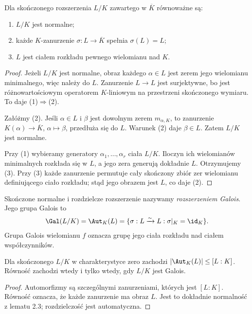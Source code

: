 \begin{lemat}
Dla skończonego rozszerzenia $L/K$ zawartego w $\overline K$ równoważne są:
\begin{enumerate}
\item $L/K$ jest normalne;
\item każde $K$-zanurzenie $\sigma:L\to\overline K$ spełnia $\sigma(L)=L$;
\item $L$ jest ciałem rozkładu pewnego wielomianu nad $K$.
\end{enumerate}
\end{lemat}
\begin{proof}
Jeżeli $L/K$ jest normalne, obraz każdego $\alpha\in L$ jest zerem jego wielomianu minimalnego, więc należy do $L$. Zanurzenie $L\to L$ jest surjektywne, bo jest różnowartościowym operatorem $K$-liniowym na przestrzeni skończonego wymiaru. To daje (1)$\Rightarrow$(2).

Załóżmy (2). Jeśli $\alpha\in L$ i $\beta$ jest dowolnym zerem $m_{\alpha,K}$, to zanurzenie $K(\alpha)\to\overline K$, $\alpha\mapsto\beta$, przedłuża się do $L$. Warunek (2) daje $\beta\in L$. Zatem $L/K$ jest normalne.

Przy (1) wybieramy generatory $\alpha_1,\dots,\alpha_r$ ciała $L/K$. Iloczyn ich wielomianów minimalnych rozkłada się w $L$, a jego zera generują dokładnie $L$. Otrzymujemy (3). Przy (3) każde zanurzenie permutuje cały skończony zbiór zer wielomianu definiującego ciało rozkładu; stąd jego obrazem jest $L$, co daje (2).
\end{proof}

\begin{definicja}
Skończone normalne i rozdzielcze rozszerzenie nazywamy \emph{rozszerzeniem Galois}. Jego grupa Galois to
\[
\Gal(L/K)=\Aut_K(L)=\{\sigma:L\xrightarrow{\sim}L:\sigma|_K=\id_K\}.
\]
Grupa Galois wielomianu $f$ oznacza grupę jego ciała rozkładu nad ciałem współczynników.
\end{definicja}

\begin{twierdzenie}
Dla skończonego $L/K$ w charakterystyce zero zachodzi $|\Aut_K(L)|\le[L:K]$. Równość zachodzi wtedy i tylko wtedy, gdy $L/K$ jest Galois.
\end{twierdzenie}
\begin{proof}
Automorfizmy są szczególnymi zanurzeniami, których jest $[L:K]$. Równość oznacza, że każde zanurzenie ma obraz $L$. Jest to dokładnie normalność z lematu 2.3; rozdzielczość jest automatyczna.
\end{proof}

